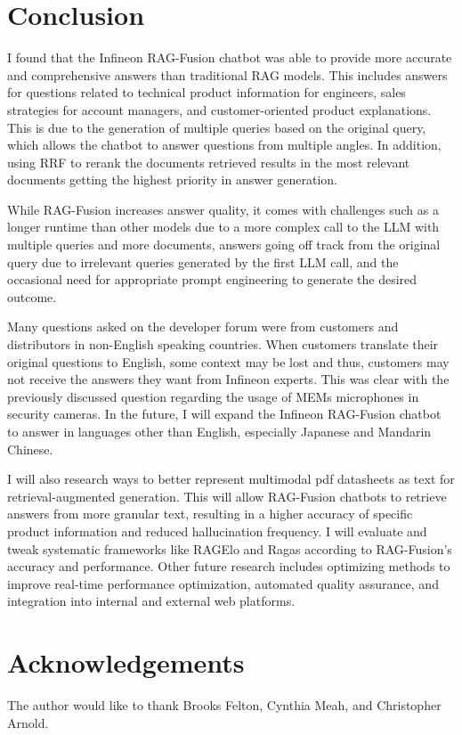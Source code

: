 \documentclass{article}
\begin{document}
\section*{Conclusion}
I found that the Infineon RAG-Fusion chatbot was able to provide more accurate and comprehensive answers than traditional RAG models. This includes answers for questions related to technical product information for engineers, sales strategies for account managers, and customer-oriented product explanations. This is due to the generation of multiple queries based on the original query, which allows the chatbot to answer questions from multiple angles. In addition, using RRF to rerank the documents retrieved results in the most relevant documents getting the highest priority in answer generation. 

While RAG-Fusion increases answer quality, it comes with challenges such as a longer runtime than other models due to a more complex call to the LLM with multiple queries and more documents, answers going off track from the original query due to irrelevant queries generated by the first LLM call, and the occasional need for appropriate prompt engineering to generate the desired outcome.

Many questions asked on the developer forum were from customers and distributors in non-English speaking countries. When customers translate their original questions to English, some context may be lost and thus, customers may not receive the answers they want from Infineon experts. This was clear with the previously discussed question regarding the usage of MEMs microphones in security cameras. In the future, I will expand the Infineon RAG-Fusion chatbot to answer in languages other than English, especially Japanese and Mandarin Chinese. 

I will also research ways to better represent multimodal pdf datasheets as text for retrieval-augmented generation. This will allow RAG-Fusion chatbots to retrieve answers from more granular text, resulting in a higher accuracy of specific product information and reduced hallucination frequency. I will evaluate and tweak systematic frameworks like RAGElo and Ragas according to RAG-Fusion’s accuracy and performance. Other future research includes optimizing methods to improve real-time performance optimization, automated quality assurance, and integration into internal and external web platforms.

\section*{Acknowledgements}
The author would like to thank Brooks Felton, Cynthia Meah, and Christopher Arnold.
\end{document}
